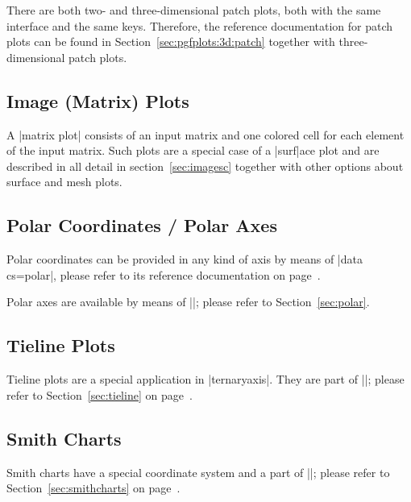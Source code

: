 {There are both two- and three-dimensional patch plots, both with the same
interface and the same keys. Therefore, the reference documentation for patch
plots can be found in Section~\ref{sec:pgfplots:3d:patch} together with
three-dimensional patch plots.


\subsection{Image (Matrix) Plots}

A |matrix plot| consists of an input matrix and one colored cell for each
element of the input matrix. Such plots are a special case of a |surf|ace plot
and are described in all detail in section~\ref{sec:imagesc} together with
other options about surface and mesh plots.


\subsection{Polar Coordinates / Polar Axes}

Polar coordinates can be provided in any kind of axis by means of
|data cs=polar|, please refer to its reference documentation on
page~\pageref{key:data:cs}.

Polar axes are available by means of ||; please refer
to Section~\ref{sec:polar}.


\subsection{Tieline Plots}

Tieline plots are a special application in |ternaryaxis|. They are part of
||; please refer to Section~\ref{sec:tieline} on
page~\pageref{sec:tieline}.


\subsection{Smith Charts}

Smith charts have a special coordinate system and a part of
||; please refer to
Section~\ref{sec:smithcharts} on page~\pageref{sec:smithcharts}.

}
